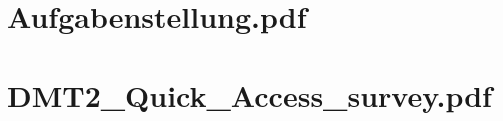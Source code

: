 \chapter{Aufgabenstellung.pdf}
\label{anhang:aufgabenstellung}



\chapter{DMT2\_Quick\_Access\_survey.pdf}
\label{anhang:survey}
